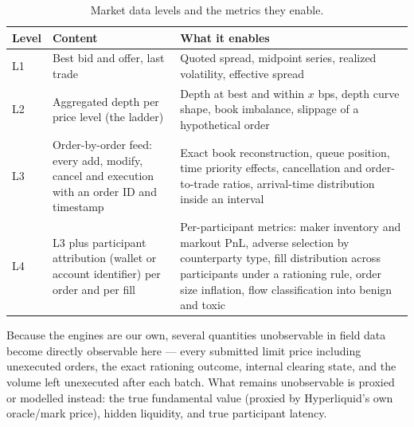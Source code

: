 \documentclass[11pt]{article}
\begin{document}
\begin{table}[htbp]
\centering
\small
\caption{Market data levels and the metrics they enable.}
\label{tab:levels}
\begin{tabularx}{\textwidth}{@{}p{1.3cm} p{4.0cm} L@{}}
\hline
\textbf{Level} & \textbf{Content} & \textbf{What it enables} \\
\hline
L1 & Best bid and offer, last trade & Quoted spread, midpoint series, realized volatility, effective spread \\
L2 & Aggregated depth per price level (the ladder) & Depth at best and within $x$ bps, depth curve shape, book imbalance, slippage of a hypothetical order \\
L3 & Order-by-order feed: every add, modify, cancel and execution with an order ID and timestamp & Exact book reconstruction, queue position, time priority effects, cancellation and order-to-trade ratios, arrival-time distribution inside an interval \\
L4 & L3 plus participant attribution (wallet or account identifier) per order and per fill & Per-participant metrics: maker inventory and markout PnL, adverse selection by counterparty type, fill distribution across participants under a rationing rule, order size inflation, flow classification into benign and toxic \\
\hline
\end{tabularx}
\end{table}

Because the engines are our own, several quantities unobservable in field data become directly observable here — every submitted limit price including unexecuted orders, the exact rationing outcome, internal clearing state, and the volume left unexecuted after each batch. What remains unobservable is proxied or modelled instead: the true fundamental value (proxied by Hyperliquid's own oracle/mark price), hidden liquidity, and true participant latency.

\end{document}
